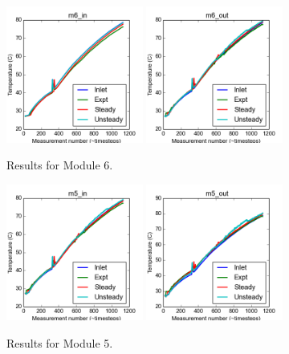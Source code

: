 \documentclass{article}
\begin{document}
\begin{figure}[!ht]
\centering
\includegraphics[width=0.4\textwidth]{../../data/ICSolar/images/Feb27_m6_in_compare.png}\hspace{0.05\textwidth}
\includegraphics[width=0.4\textwidth]{../../data/ICSolar/images/Feb27_m6_out_compare.png}\hspace{0.05\textwidth}\\
\caption{Results for Module 6.}\end{figure}
\begin{figure}[!ht]
\centering
\includegraphics[width=0.4\textwidth]{../../data/ICSolar/images/Feb27_m5_in_compare.png}\hspace{0.05\textwidth}
\includegraphics[width=0.4\textwidth]{../../data/ICSolar/images/Feb27_m5_out_compare.png}\hspace{0.05\textwidth}\\
\caption{Results for Module 5.}\end{figure}
\end{document}
